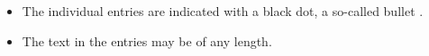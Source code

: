 \begin{itemize} \itemsep0em
  \item The individual entries are indicated with a black dot, a so-called bullet \cite{chua2010}.
  \item The text in the entries may be of any length.
\end{itemize}

